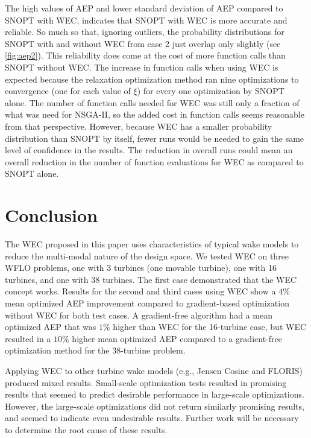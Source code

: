 \documentclass[a4paper]{jpconf}
\begin{document}
The high values of AEP and lower standard deviation of AEP compared to SNOPT with WEC, indicates that SNOPT with WEC is more accurate and reliable. So much so that, ignoring outliers, the probability distributions for SNOPT with and without WEC from case 2 just overlap only slightly (see \cref{fig:aep2}). This reliability does come at the cost of more function calls than SNOPT without WEC. The increase in function calls when using WEC is expected because the relaxation optimization method ran nine optimizations to convergence (one for each value of $\xi$) for every one optimization by SNOPT alone. The number of function calls needed for WEC was still only a fraction of what was need for NSGA-II, so the added cost in function calls seems reasonable from that perspective. However, because WEC has a smaller probability distribution than SNOPT by itself, fewer runs would be needed to gain the same level of confidence in the results. The reduction in overall runs could mean an overall reduction in the number of function evaluations for WEC as compared to SNOPT alone.

\section{Conclusion}
The WEC proposed in this paper uses characteristics of typical wake models to reduce the multi-modal nature of the design space. We tested WEC on three WFLO problems, one with 3 turbines (one movable turbine), one with 16 turbines, and one with 38 turbines. The first case demonstrated that the WEC concept works. Results for the second and third cases using WEC show a $4\%$ mean optimized AEP improvement compared to gradient-based optimization without WEC for both test cases. A gradient-free algorithm had a mean optimized AEP that was $1\%$ higher than WEC for the 16-turbine case, but WEC resulted in a $10\%$ higher mean optimized AEP compared to a gradient-free optimization method for the 38-turbine problem.

Applying WEC to other turbine wake models (e.g., Jensen Cosine and FLORIS) produced mixed results. Small-scale optimization tests resulted in promising results that seemed to predict desirable performance in large-scale optimizations. However, the large-scale optimizations did not return similarly promising results, and seemed to indicate even undesirable results. Further work will be necessary to determine the root cause of these results.

\end{document}
